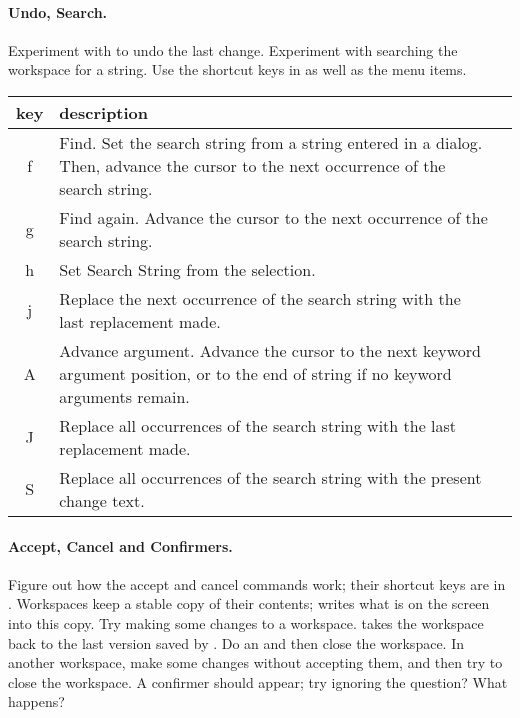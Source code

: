 \documentclass[a4paper,10pt,twoside]{book}
\begin{document}
\paragraph{Undo, Search.} Experiment with  to undo the last change. Experiment with searching the workspace for a string. Use the shortcut keys in  as well as the menu items.

\begin{table}[htbp]
   \centering
   \begin{tabular}{cp{5in}c} 		%
      \toprule
      key    & description &\\
      \midrule
      f      & Find. Set the search string from a string entered in a dialog. Then, advance the cursor to the next occurrence of the search string.
&  \\


g & Find again. Advance the cursor to the next occurrence of the search string. & \\

h & Set Search String from the selection. & \\

j & Replace the next occurrence of the search string with the last replacement made. & \\

A & Advance argument. Advance the cursor to the next keyword argument position, or to the end of string if no keyword arguments remain. & \\

J & Replace all occurrences of the search string with the last replacement made. & \\

S & Replace all occurrences of the search string with the present change text. & \\

      \bottomrule
   \end{tabular}
\end{table}

\paragraph{Accept, Cancel and Confirmers.}
Figure out how the accept and cancel commands work; their shortcut keys are in .
Workspaces keep a stable copy of their contents;  writes what is on the screen into this copy.
Try making some changes to a workspace.  takes the workspace back to the last version saved by . Do an  and then close the workspace.
In another workspace, make some changes without accepting them, and then try to close the workspace. A confirmer should appear; try ignoring the question? What happens?
\end{document}
